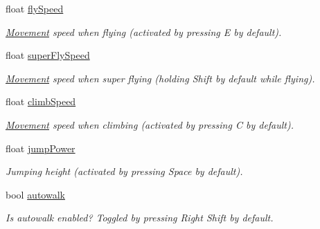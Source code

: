 \begin{DoxyCompactItemize}
float \mbox{\hyperlink{class_lua_1_1_player_entity_a07be3c99f61960cadd5333939bc9ee88}{fly\+Speed}}
\begin{DoxyCompactList}\small\item\em \mbox{\hyperlink{class_lua_1_1_movement}{Movement}} speed when flying (activated by pressing {\ttfamily E} by default). \end{DoxyCompactList}\item 
float \mbox{\hyperlink{class_lua_1_1_player_entity_aee7c81573cc1de31d9f64fd13b534ae2}{super\+Fly\+Speed}}
\begin{DoxyCompactList}\small\item\em \mbox{\hyperlink{class_lua_1_1_movement}{Movement}} speed when super flying (holding {\ttfamily Shift} by default while flying). \end{DoxyCompactList}\item 
float \mbox{\hyperlink{class_lua_1_1_player_entity_a6917cc802f4f2de29b01e7c968b6336e}{climb\+Speed}}
\begin{DoxyCompactList}\small\item\em \mbox{\hyperlink{class_lua_1_1_movement}{Movement}} speed when climbing (activated by pressing {\ttfamily C} by default). \end{DoxyCompactList}\item 
float \mbox{\hyperlink{class_lua_1_1_player_entity_aac79f44819e1adfc1b5a2f6b1bbe61e6}{jump\+Power}}
\begin{DoxyCompactList}\small\item\em Jumping height (activated by pressing {\ttfamily Space} by default). \end{DoxyCompactList}\item 
bool \mbox{\hyperlink{class_lua_1_1_player_entity_a1137d463c4ca74abf6fcb032e5311755}{autowalk}}
\begin{DoxyCompactList}\small\item\em Is autowalk enabled? Toggled by pressing {\ttfamily Right Shift} by default. \end{DoxyCompactList}\item 

\end{DoxyCompactItemize}
